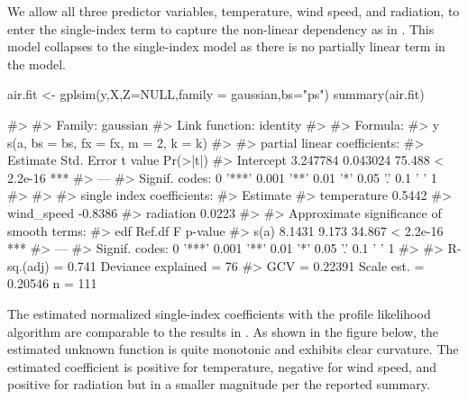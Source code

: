 We allow all three predictor variables, temperature, wind speed, and radiation, to enter the single-index term to capture the non-linear dependency as in \cite{yu_penalized_2002}. This model collapses to the single-index model as there is no partially linear term in the model.

\begin{Schunk}
  \begin{Sinput}
  air.fit <- gplsim(y,X,Z=NULL,family = gaussian,bs="ps")
  summary(air.fit)
  \end{Sinput}
  \begin{Soutput}
  #> 
  #> Family: gaussian 
  #> Link function: identity 
  #> 
  #> Formula:
  #> y ~ s(a, bs = bs, fx = fx, m = 2, k = k)
  #> 
  #> partial linear coefficients:
  #>           Estimate Std. Error t value  Pr(>|t|)    
  #> Intercept 3.247784   0.043024  75.488 < 2.2e-16 ***
  #> ---
  #> Signif. codes:  0 '***' 0.001 '**' 0.01 '*' 0.05 '.' 0.1 ' ' 1
  #> 
  #> 
  #> single index coefficients:
  #>             Estimate
  #> temperature   0.5442
  #> wind_speed   -0.8386
  #> radiation     0.0223
  #> 
  #> Approximate significance of smooth terms:
  #>         edf Ref.df      F   p-value    
  #> s(a) 8.1431  9.173 34.867 < 2.2e-16 ***
  #> ---
  #> Signif. codes:  0 '***' 0.001 '**' 0.01 '*' 0.05 '.' 0.1 ' ' 1
  #> 
  #> R-sq.(adj) =  0.741   Deviance explained =   76%
  #> GCV = 0.22391  Scale est. = 0.20546   n = 111
  \end{Soutput}
  \end{Schunk}

  The estimated normalized single-index coefficients with the profile likelihood algorithm are comparable to the results in \cite{yu_penalized_2002}. 
  As shown in the figure below, the estimated unknown function is quite monotonic and exhibits clear curvature. The estimated coefficient is positive for temperature, negative for wind speed, and positive for radiation but in a smaller magnitude per the reported summary. 

